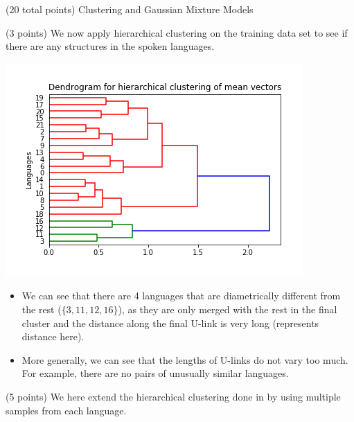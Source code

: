 \documentclass[12pt]{article}
\begin{document}
\begin{question}{(20 total points) Clustering and Gaussian Mixture Models}
\begin{subquestion}
   \end{subquestion}
   \begin{subquestion}{(3 points)
       We now apply hierarchical clustering on the training data set
       to see if there are any structures in the spoken languages.
     } \label{Q3.3}


     

      \begin{answerbox}{35em}
           \begin{center}
	\includegraphics[width=\textwidth]{imgs/3_3.png}
	\end{center}
	\begin{itemize}
	\itemsep -3pt {}
	\item We can see that there are 4 languages that are diametrically different from the rest ($\{3,11,12,16\}$), as they are only merged with the rest in the final cluster and the distance along the final U-link is very long (represents distance here).
	\item More generally, we can see that the lengths of U-links do not vary too much. For example, there are no pairs of unusually similar languages. 
	\end{itemize}
      \end{answerbox}
  


   \end{subquestion}
   \begin{subquestion}{(5 points)
       We here extend the hierarchical clustering done in  by
       using multiple samples from each language.
     } \label{Q3.4}



\end{subquestion}
\end{question}
\end{document}
